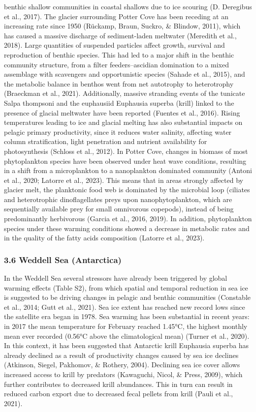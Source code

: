 \documentclass[
]{article}
\begin{document}
benthic shallow communities in coastal shallows due to ice scouring (D.
Deregibus et al., 2017). The glacier surrounding Potter Cove has been
receding at an increasing rate since 1950 (Rückamp, Braun, Suckro, \&
Blindow, 2011), which has caused a massive discharge of sediment-laden
meltwater (Meredith et al., 2018). Large quantities of suspended
particles affect growth, survival and reproduction of benthic species.
This had led to a major shift in the benthic community structure, from a
filter feeders--ascidian domination to a mixed assemblage with
scavengers and opportunistic species (Sahade et al., 2015), and the
metabolic balance in benthos went from net autotrophy to heterotrophy
(Braeckman et al., 2021). Additionally, massive stranding events of the
tunicate Salpa thompsoni and the euphausiid Euphausia superba (krill)
linked to the presence of glacial meltwater have been reported (Fuentes
et al., 2016). Rising temperatures leading to ice and glacial melting
has also substantial impacts on pelagic primary productivity, since it
reduces water salinity, affecting water column stratification, light
penetration and nutrient availability for photosynthesis (Schloss et
al., 2012). In Potter Cove, changes in biomass of most phytoplankton
species have been observed under heat wave conditions, resulting in a
shift from a microplankton to a nanoplankton dominated community (Antoni
et al., 2020; Latorre et al., 2023). This means that in areas strongly
affected by glacier melt, the planktonic food web is dominated by the
microbial loop (ciliates and heterotrophic dinoflagellates preys upon
nanophytoplankton, which are sequentially available prey for small
omnivorous copepods), instead of being predominantly herbivorous (Garcia
et al., 2016, 2019). In addition, phytoplankton species under these
warming conditions showed a decrease in metabolic rates and in the
quality of the fatty acids composition (Latorre et al., 2023).

\subsubsection{3.6 Weddell Sea
(Antarctica)}\label{weddell-sea-antarctica}

In the Weddell Sea several stressors have already been triggered by
global warming effects (Table S2), from which spatial and temporal
reduction in sea ice is suggested to be driving changes in pelagic and
benthic communities (Constable et al., 2014; Gutt et al., 2021). Sea ice
extent has reached new record lows since the satellite era began in
1978. Sea warming has been substantial in recent years: in 2017 the mean
temperature for February reached 1.45°C, the highest monthly mean ever
recorded (0.56°C above the climatological mean) (Turner et al., 2020).
In this context, it has been suggested that Antarctic krill Euphausia
superba has already declined as a result of productivity changes caused
by sea ice declines (Atkinson, Siegel, Pakhomov, \& Rothery, 2004).
Declining sea ice cover allows increased access to krill by predators
(Kawaguchi, Nicol, \& Press, 2009), which further contributes to
decreased krill abundances. This in turn can result in reduced carbon
export due to decreased fecal pellets from krill (Pauli et al., 2021).
\end{document}
